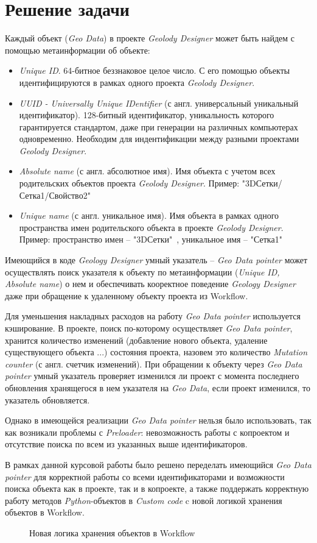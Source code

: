 \section{Решение задачи}
Каждый объект (\emph{Geo Data}) в проекте \emph{Geolody Designer} может быть найдем с помощью метаинформации об объекте:
\begin{itemize}
	\item \emph{Unique ID}. 64-битное беззнаковое целое число. С его помощью объекты идентифицируются в рамках одного проекта \emph{Geolody Designer}.
	\item \emph{UUID - Universally Unique IDentifier}\cite{UUID} (с англ. универсальный уникальный идентификатор). 128-битный идентификатор, уникальность которого гарантируется стандартом\cite{UUID}, даже при генерации на различных компьютерах одновременно. Необходим для индентификации между разными проектами \emph{Geolody Designer}.
	\item \emph{Absolute name} (с англ. абсолютное имя). Имя объекта с учетом всех родительских объектов проекта \emph{Geolody Designer}. Пример:  "3DСетки/Сетка1/Свойство2"\ 
	\item \emph{Unique name} (с англ. уникальное имя). Имя объекта в рамках одного пространства имен родительского объекта в проекте \emph{Geolody Designer}. Пример: пространство имен -- "3DСетки"\ , уникальное имя -- "Сетка1"\ 
\end{itemize}

Имеющийся в коде \emph{Geology Designer} умный указатель -- \emph{Geo Data pointer} может осуществлять поиск указателя к объекту по метаинформации (\emph{Unique ID, Absolute name}) о нем и обеспечивать кооректное поведение \emph{Geology Designer} даже при обращение к удаленному объекту проекта из Workflow. 

Для уменьшения накладных расходов на работу \emph{Geo Data pointer} используется кэширование. В проекте, поиск по-которому осуществляет \emph{Geo Data pointer},  хранится количество изменений (добавление нового объекта, удаление существующего объекта ...) состояния проекта, назовем это количество \emph{Mutation counter} (с англ. счетчик изменений). При обращении к объекту через \emph{Geo Data pointer} умный указатель проверяет изменился ли проект с момента последнего обновления хранящегося в нем указателя на \emph{Geo Data}, если проект изменился, то указатель обновляется.

Однако в имеющейся реализации \emph{Geo Data pointer} нельзя было использовать, так как возникали проблемы с \emph{Preloader}: невозможность работы с копроектом и отсутствие поиска по всем из указанных выше идентификаторов.

В рамках данной курсовой работы было решено переделать имеющийся \emph{Geo Data pointer} для корректной работы со всеми идентификаторами и возможности поиска объекта как в проекте, так и в копроекте, а также поддержать корректную работу методов \emph{Python}-объектов в \emph{Custom code} c новой логикой хранения объектов в Workflow.

\begin{figure}[H]	
	\caption{Новая логика хранения объектов в Workflow}
\end{figure}



